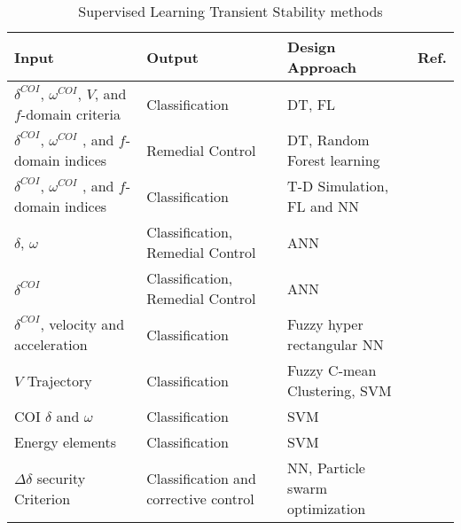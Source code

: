 \documentclass[journal]{IEEEtran}
\begin{document}
\begin{table*}[t]
 \caption{Supervised Learning Transient Stability methods} 
\centering{}{\footnotesize }%
	\begin{tabular}{ p{5cm} p{5cm} p{5.25cm}  p{1cm}}
	\hline\hline
{\footnotesize Input }&{\footnotesize Output} & {\footnotesize Design Approach  } & {\footnotesize Ref.} \tabularnewline
\hline


\vspace{-1mm} { \footnotesize  $\delta^{COI}$, $\omega^{COI}$, $V$, and $f$-domain criteria} &\vspace{-1mm} {\footnotesize  Classification} &\vspace{-1mm} {\footnotesize  DT, FL }&\vspace{-1mm} {\footnotesize  \cite{4749253}} \tabularnewline

{\footnotesize $\delta^{COI}$, $\omega^{COI}$ , and $f$-domain indices} &{\footnotesize  Remedial Control} &{\footnotesize  DT, Random Forest learning} &{\footnotesize  \cite{5545486}} \tabularnewline


{\footnotesize $\delta^{COI}$, $\omega^{COI}$ , and $f$-domain indices} &{\footnotesize  Classification }&{\footnotesize  T-D Simulation, FL and NN} &{\footnotesize  \cite{932291}} \tabularnewline

{\footnotesize  $\delta$, $\omega$  }&{\footnotesize  Classification, Remedial Control }&{\footnotesize ANN} &{\footnotesize  \cite{4282006}  }\\

{\footnotesize  $\delta^{COI}$ }&{\footnotesize  Classification, Remedial Control }&{\footnotesize ANN} &{\footnotesize  \cite{6184356} }\tabularnewline

{\footnotesize $\delta^{COI}$, velocity and acceleration} &{\footnotesize  Classification} &{\footnotesize  Fuzzy hyper rectangular NN }&{\footnotesize \cite{761898} }\tabularnewline


{\footnotesize $V$ Trajectory }& {\footnotesize Classification} &{\small  Fuzzy C-mean Clustering, SVM }&{\footnotesize  \cite{5357461}} \tabularnewline


{\footnotesize COI $\delta$ and $\omega$} & {\footnotesize Classification }& {\footnotesize SVM } & {\footnotesize \cite{6870274}} \tabularnewline

{\footnotesize Energy elements} & {\footnotesize Classification }& {\footnotesize SVM } & {\footnotesize \cite{6902826}} \tabularnewline

{\footnotesize  $\Delta \delta$ security Criterion} & {\footnotesize Classification and corrective control}&{\footnotesize  NN, Particle swarm optimization} & {\footnotesize \cite{5291695} }\tabularnewline
\hline\hline

	\end{tabular} 
  \label{Table:TSAAI}
\end{table*}
\end{document}
